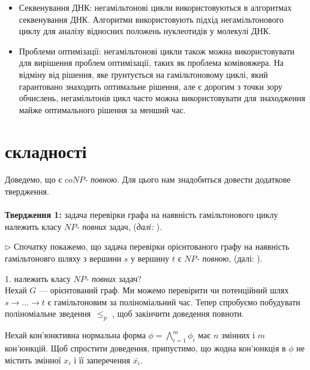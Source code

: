 \documentclass[14pt]{article}
\begin{document}
\begin{spacing}{1.175}
\begin{itemize}
\begin{itemize}
            \item Секвенування ДНК: негамільтонові цикли використовуються в алгоритмах секвенування ДНК. Алгоритми використовують підхід негамільтонового циклу для аналізу відносних положень нуклеотидів у молекулі ДНК.

            \item Проблеми оптимізації: негамільтонові цикли також можна використовувати для вирішення проблем оптимізації, таких як проблема комівояжера. На відміну від рішення, яке ґрунтується на гамільтоновому циклі, який гарантовано знаходить оптимальне рішення, але є дорогим з точки зору обчислень, негамільтонів цикл часто можна використовувати для знаходження майже оптимального рішення за менший час.
        
        \end{itemize}
    \end{itemize}
    
    \section{ складності}

    Доведемо, що \nonhamcycle\hspace{0.05cm} є \(coNP\)\textit{- повною}. Для цього нам знадобиться довести додаткове твердження. \\\\
    \textbf{Твердження 1:} задача перевірки графа на наявність гамільтонового циклу належить класу \(NP\)\textit{- повних} задач, (\textit{далі:} \hamcycle).
    
    \(\triangleright\) Спочатку покажемо, що задача перевірки орієнтованого графу на наявність гамільтоновго шляху з вершини \(s\) у вершину \(t\) є \(NP\)\textit{- повною}, (далі: \dhampath).

    1. \dhampath\hspace{0.05cm} належить класу \(NP\)\textit{- повних} задач?\\
    Нехай \(G\) — орієнтований граф. Ми можемо перевірити чи потенційний шлях \(s \to \dots \to t\) є гамільтоновим за поліноміальний час. Тепер спробуємо побудувати поліноміальне зведення \tsat \,\(\le_p\) \dhampath, щоб закінчити доведення повноти.
    
    Нехай кон'юнктивна нормальна форма \(\phi = \bigwedge\limits_{i=1}^m \phi_{i}\) має \(n\) змінних і \(m\) кон'юнкцій. Щоб спростити доведення, припустимо, що жодна кон'юнкція в \(\phi\) не містить змінної \(x_i\) і її заперечення \(\bar{x_i}\).  
    

\end{spacing}
\end{document}
